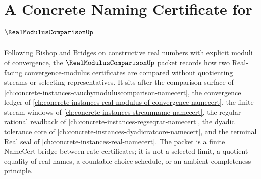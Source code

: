 \chapter{A Concrete Naming Certificate for $\RealModulusComparisonUp$}
\label{ch:concrete-instances-real-modulus-comparison-namecert}

Following Bishop and Bridges on constructive real numbers with explicit moduli of convergence, the $\RealModulusComparisonUp$ packet records how two Real-facing convergence-modulus certificates are compared without quotienting streams or selecting representatives. It sits after the comparison surface of \autoref{ch:concrete-instances-cauchymoduluscomparison-namecert}, the convergence ledger of \autoref{ch:concrete-instances-real-modulus-of-convergence-namecert}, the finite stream windows of \autoref{ch:concrete-instances-streamname-namecert}, the regular rational readback of \autoref{ch:concrete-instances-regseqrat-namecert}, the dyadic tolerance core of \autoref{ch:concrete-instances-dyadicratcore-namecert}, and the terminal Real seal of \autoref{ch:concrete-instances-real-namecert}. The packet is a finite NameCert bridge between rate certificates; it is not a selected limit, a quotient equality of real names, a countable-choice schedule, or an ambient completeness principle.


